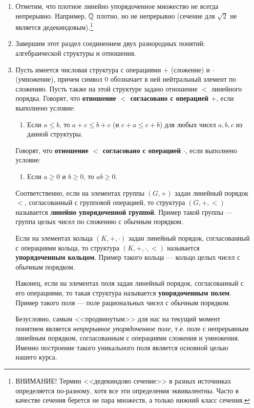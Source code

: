 \begin{enumerate}
\item Отметим, что плотное линейно упорядоченное множество не всегда непрерывно. Например, $\mathbb Q$ плотно, но не непрерывно (сечение для $\sqrt 2$ не является дедекиндовым).\footnote{ВНИМАНИЕ! Термин <<дедекиндово сечение>> в разных источниках определяется по-разному, хотя все эти определения эквивалентны. Часто в качестве сечения берется не пара множеств, а только нижний класс сечения.}

\item Завершим этот раздел соединением двух разнородных понятий: алгебраической структуры и отношения.
\item Пусть имеется числовая структура с операциями $+$ (сложение) и $\cdot$ (умножение), причем символ 0 обозначает в ней нейтральный элемент по сложению. Пусть также на этой структуре задано отношение $<$ линейного порядка. Говорят, что \textbf{отношение $<$ согласовано с операцией $+$}, если выполнено условие:
\begin{enumerate}[resume*]
\item Если $a\le b$, то $a+c\le b+c$ (и $c+a\le c+b$) для любых чисел $a,b,c$ из данной структуры.
\end{enumerate}
Говорят, что \textbf{отношение $<$ согласовано с операцией $\cdot$}, если выполнено условие:
\begin{enumerate}[resume*]
\item Если $a\ge 0$ и $b\ge 0$, то $ab\ge 0$.
\end{enumerate}

Соответственно, если на элементах группы $(G,+)$ задан линейный порядок $<$, согласованный с групповой операцией, то структура $(G,+,<)$ называется \textbf{линейно упорядоченной группой}. Пример такой группы --- группа целых чисел по сложению с обычным порядком.

Если на элементах кольца $(K,+,\cdot)$ задан линейный порядок, согласованный с операциями кольца, то структура $(K,+,\cdot,<)$ называется \textbf{упорядоченным кольцом}. Пример такого кольца --- кольцо целых чисел с обычным порядком.

Наконец, если на элементах поля задан линейный порядок, согласованный с его операциями, то такая структура называется \textbf{упорядоченным полем}. Пример такого поля --- поле рациональных чисел с обычным порядком.

Безусловно, самым <<продвинутым>> для нас на текущий момент понятием является \textit{непрерывное упорядоченное поле}, т.е. поле с непрерывным линейным порядком, согласованным с операциями сложения и умножения. Именно построение такого уникального поля является основной целью нашего курса.
\end{enumerate}

